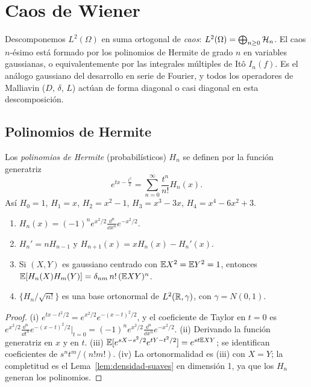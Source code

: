 \chapter{Caos de Wiener}\label{cap:caos}

\begin{panorama}
Descomponemos $L^2(\Omega)$ en suma ortogonal de \emph{caos}: $L^2(\Omega)=\bigoplus_{n\ge0}\mathcal{H}_n$. El caos $n$-ésimo
está formado por los polinomios de Hermite de grado $n$ en variables gaussianas, o
equivalentemente por las integrales múltiples de Itô $I_n(f)$. Es el análogo gaussiano del
desarrollo en serie de Fourier, y todos los operadores de Malliavin ($D$, $\delta$, $L$) actúan de
forma diagonal o casi diagonal en esta descomposición.
\end{panorama}

\section{Polinomios de Hermite}

\begin{definicion}
Los \emph{polinomios de Hermite} (probabilísticos) $H_n$ se definen por la función
generatriz
\[
  e^{tx-\frac{t^2}{2}}=\sum_{n=0}^\infty\frac{t^n}{n!}H_n(x).
\]
Así $H_0=1$, $H_1=x$, $H_2=x^2-1$, $H_3=x^3-3x$, $H_4=x^4-6x^2+3$.
\end{definicion}

\begin{proposicion}\label{prop:hermite}
\begin{enumerate}[label=(\roman*)]
  \item $H_n(x)=(-1)^ne^{x^2/2}\frac{\dd^n}{\dd x^n}e^{-x^2/2}$.
  \item $H_n'=nH_{n-1}$ y $H_{n+1}(x)=xH_n(x)-H_n'(x)$.
  \item Si $(X,Y)$ es gaussiano centrado con $\mathbb{E} X^2=\mathbb{E} Y^2=1$, entonces $\mathbb{E}[H_n(X)H_m(Y)]=
  \delta_{nm}\,n!\,(\mathbb{E} XY)^n$.
  \item $\{H_n/\sqrt{n!}\}$ es una base ortonormal de $L^2(\mathbb{R},\gamma)$, con $\gamma=N(0,1)$.
\end{enumerate}
\end{proposicion}

\begin{proof}
(i) $e^{tx-t^2/2}=e^{x^2/2}e^{-(x-t)^2/2}$, y el coeficiente de Taylor en $t=0$ es
$e^{x^2/2}\frac{\dd^n}{\dd t^n}e^{-(x-t)^2/2}|_{t=0}=(-1)^ne^{x^2/2}\frac{\dd^n}{\dd x^n}e^{-x^2/2}$. (ii) Derivando la función generatriz en $x$ y
en $t$. (iii) $\mathbb{E}[e^{sX-s^2/2}e^{tY-t^2/2}]=e^{st\mathbb{E} XY}$; se identifican coeficientes de $s^nt^m/(n!m!)$. (iv) La
ortonormalidad es (iii) con $X=Y$; la completitud es el Lema~\ref{lem:densidad-suaves} en dimensión 1, ya que los
$H_n$ generan los polinomios.
\end{proof}

